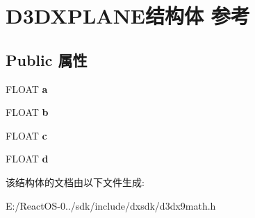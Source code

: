 \hypertarget{struct_d3_d_x_p_l_a_n_e}{}\section{D3\+D\+X\+P\+L\+A\+N\+E结构体 参考}
\label{struct_d3_d_x_p_l_a_n_e}
\subsection*{Public 属性}
\begin{DoxyCompactItemize}
\item 
\mbox{\label{struct_d3_d_x_p_l_a_n_e_a0cb022e23a5bbb3fe59a245e0d1b25a9}} 
F\+L\+O\+AT {\bfseries a}
\item 
\mbox{\label{struct_d3_d_x_p_l_a_n_e_ae6ee03e5d06e7f1b1bdd28ab77d53f20}} 
F\+L\+O\+AT {\bfseries b}
\item 
\mbox{\label{struct_d3_d_x_p_l_a_n_e_a3c88ce09b115aaacd10d45a6c61c3e3a}} 
F\+L\+O\+AT {\bfseries c}
\item 
\mbox{\label{struct_d3_d_x_p_l_a_n_e_a417cab572425a27e9181f9b472ca86aa}} 
F\+L\+O\+AT {\bfseries d}
\end{DoxyCompactItemize}


该结构体的文档由以下文件生成\+:\begin{DoxyCompactItemize}
\item 
E\+:/\+React\+O\+S-\/0../sdk/include/dxsdk/d3dx9math.\+h\end{DoxyCompactItemize}
